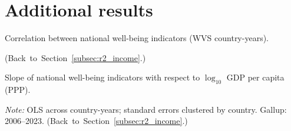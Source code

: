 \documentclass[12pt]{article}
\begin{document}

\clearpage
\appendix
\section{Additional results}\label{app:additional}
\renewcommand{\thetable}{A\arabic{table}}
\renewcommand{\thefigure}{A\arabic{figure}}
\setcounter{table}{0}
\setcounter{figure}{0}

\begin{table}[htbp]
    \centering
    \caption{Correlation between national well-being indicators (WVS country-years).}\label{tab:correlation}
    \begin{adjustbox}{max width=\textwidth}
    
    \end{adjustbox}
    \begin{minipage}{\textwidth}\footnotesize \hfill(Back~to~Section~\ref{subsec:r2_income}.)\end{minipage}
\end{table}

\begin{table}[htbp]
    \centering
    \caption{Slope of national well-being indicators with respect to $\log_{10}$ GDP per capita (PPP).}\label{tab:slopes}
    \begin{adjustbox}{max width=\textwidth}
    
    \end{adjustbox}
    \begin{minipage}{\textwidth}\footnotesize \textit{Note:} OLS across country-years; standard errors clustered by country. Gallup: 2006--2023. \hfill(Back~to~Section~\ref{subsec:r2_income}.)\end{minipage}
\end{table}
\end{document}
